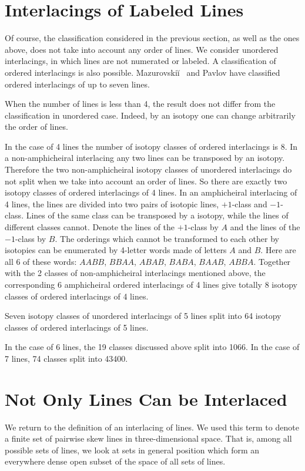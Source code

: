\documentclass{article}
\begin{document}
\section{Interlacings of Labeled Lines}
Of course, the classification considered in the previous section, as well 
as the ones above, does not take into account any order of lines. We consider 
unordered interlacings, in which lines are not numerated or labeled. A
classification of ordered interlacings is also possible. Mazurovski\u{i} \  
and Pavlov \cite{MP} have classified ordered interlacings of up to seven 
lines. 

When the number of lines is less than 4, the result does not
differ from the classification in unordered case. Indeed, by an
isotopy one can change arbitrarily the order of lines. 

In the case of 4 lines the number of isotopy classes of ordered
interlacings is 8. In a non-amphicheiral interlacing any two lines can
be transposed by an isotopy. Therefore the two non-amphicheiral
isotopy classes of unordered interlacings do not split when we
take into account an order of lines. So there are exactly two 
isotopy classes of ordered interlacings of 4 lines. In an amphicheiral
interlacing of 4 lines, the lines are divided into two pairs of
isotopic lines, $+1$-class and $-1$-class. Lines of the same class can
be transposed by a isotopy, while the lines of different classes
cannot. Denote the lines of the $+1$-class by $A$ and the lines
of the $-1$-class by $B$. The orderings which cannot be transformed to
each other by isotopies can be enumerated by 4-letter words made
of letters $A$ and $B$. Here are all 6 of these words: $AABB$, $BBAA$, $ABAB$,
$BABA$, $BAAB$, $ABBA$. Together with the 2 classes of non-amphicheiral
interlacings mentioned above, the corresponding 6 amphicheiral ordered
interlacings of 4 lines give totally 8 isotopy classes of ordered
interlacings of 4 lines.

Seven isotopy classes of unordered interlacings of 5 lines split
into 64 isotopy classes of ordered interlacings of 5 lines.

In the case of 6 lines, the 19 classes discussed above split into 1066.
In the case of 7 lines, 74 classes split into 43400.

\section{Not Only Lines Can be Interlaced}

We return to the definition of an interlacing of lines. We used this term to
denote a finite set of pairwise skew lines in three-dimensional space. That is,
among all possible sets of lines, we look at sets in general position which form
an everywhere dense open subset of the space of all sets of lines.
\end{document}
